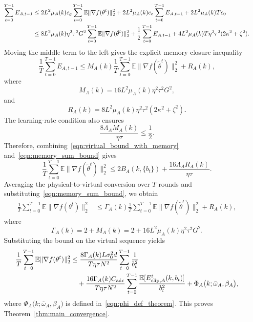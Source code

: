 \documentclass[conference]{IEEEtran}
\begin{document}
\begin{align}
    \sum_{t=0}^{T-1}E_{A,t-1}
    &\le
    2L^2\mu_A(k)c_g
    \sum_{t=0}^{T-1}\mathbb{E}\|\nabla f(\tilde\theta^t)\|_2^2
    +2L^2\mu_A(k)c_e
    \sum_{t=0}^{T-1}E_{A,t-1}
    +2L^2\mu_A(k)Tc_0
    \notag\\
    &\le
    8L^2\mu_A(k)\eta^2\tau^2G^2
    \sum_{t=0}^{T-1}\mathbb{E}\|\nabla f(\tilde\theta^t)\|_2^2
    +\frac12\sum_{t=0}^{T-1}E_{A,t-1}
    +4L^2\mu_A(k)T\eta^2\tau^2(2\kappa^2+\zeta^2).
\end{align}
Moving the middle term to the left gives the explicit memory-closure inequality
\begin{equation}
    \label{eqn:memory_sum_bound}
    \frac1T\sum_{t=0}^{T-1}E_{A,t-1}
    \le
    M_A(k)
    \frac1T\sum_{t=0}^{T-1}\mathbb{E}\|\nabla f(\tilde\theta^t)\|_2^2
    +R_A(k),
\end{equation}
where
\begin{equation}
    M_A(k)=16L^2\mu_A(k)\eta^2\tau^2G^2,
\end{equation}
and
\begin{equation}
    R_A(k)=8L^2\mu_A(k)\eta^2\tau^2(2\kappa^2+\zeta^2).
\end{equation}
The learning-rate condition also ensures
\begin{equation}
    \frac{8\Lambda_AM_A(k)}{\eta\tau}\le \frac12.
\end{equation}
Therefore, combining~\eqref{eqn:virtual_bound_with_memory} and~\eqref{eqn:memory_sum_bound} gives
\begin{equation}
    \frac1T\sum_{t=0}^{T-1}\mathbb{E}\|\nabla f(\tilde\theta^t)\|_2^2
    \le
    2B_A(k,\{b_t\})+\frac{16\Lambda_AR_A(k)}{\eta\tau}.
\end{equation}
Averaging the physical-to-virtual conversion over $T$ rounds and substituting~\eqref{eqn:memory_sum_bound}, we obtain
\begin{align}
    \frac1T\sum_{t=0}^{T-1}\mathbb{E}\|\nabla f(\theta^t)\|_2^2
    &\le
    \Gamma_A(k)
    \frac1T\sum_{t=0}^{T-1}\mathbb{E}\|\nabla f(\tilde\theta^t)\|_2^2
    +R_A(k),
\end{align}
where
\begin{equation}
    \Gamma_A(k)=2+M_A(k)=2+16L^2\mu_A(k)\eta^2\tau^2G^2.
\end{equation}
Substituting the bound on the virtual sequence yields
\begin{align}
    \label{eqn:final_adc_convergence_bound}
    \frac1T\sum_{t=0}^{T-1}\mathbb{E}\|\nabla f(\theta^t)\|_2^2
    &\le
    \frac{8\Gamma_A(k)L\sigma_0^2d}{T\eta\tau N^2}
    \sum_{t=0}^{T-1}\frac1{b_t^2}
    \notag\\
    &\quad+
    \frac{16\Gamma_A(k)C_{\mathrm{adc}}}{T\eta\tau N^2}
    \sum_{t=0}^{T-1}
    \frac{\mathbb{E}[E_{\mathrm{clip},A}^t(k,b_t)]}{b_t^2}
    +\Phi_A\big(k;\bar{\omega}_A,\beta_A\big),
\end{align}
where $\Phi_A\big(k;\bar{\omega}_A,\beta_A\big)$ is defined in~\eqref{eqn:phi_def_theorem}. This proves Theorem~\ref{thm:main_convergence}.
\end{document}
